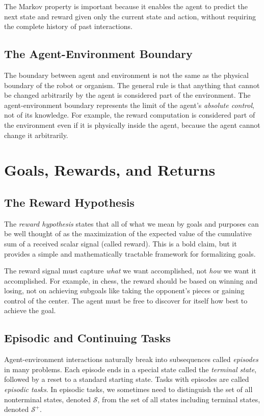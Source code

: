 \documentclass[12pt]{article}
\begin{document}
The Markov property is important because it enables the agent to predict the next state and reward given only the current state and action, without requiring the complete history of past interactions.

\subsection{The Agent-Environment Boundary}

The boundary between agent and environment is not the same as the physical boundary of the robot or organism. The general rule is that anything that cannot be changed arbitrarily by the agent is considered part of the environment. The agent-environment boundary represents the limit of the agent's \textit{absolute control}, not of its knowledge. For example, the reward computation is considered part of the environment even if it is physically inside the agent, because the agent cannot change it arbitrarily.

\section{Goals, Rewards, and Returns}

\subsection{The Reward Hypothesis}

The \textit{reward hypothesis} states that all of what we mean by goals and purposes can be well thought of as the maximization of the expected value of the cumulative sum of a received scalar signal (called reward). This is a bold claim, but it provides a simple and mathematically tractable framework for formalizing goals.

The reward signal must capture \textit{what} we want accomplished, not \textit{how} we want it accomplished. For example, in chess, the reward should be based on winning and losing, not on achieving subgoals like taking the opponent's pieces or gaining control of the center. The agent must be free to discover for itself how best to achieve the goal.

\subsection{Episodic and Continuing Tasks}

Agent-environment interactions naturally break into subsequences called \textit{episodes} in many problems. Each episode ends in a special state called the \textit{terminal state}, followed by a reset to a standard starting state. Tasks with episodes are called \textit{episodic tasks}. In episodic tasks, we sometimes need to distinguish the set of all nonterminal states, denoted $\mathcal{S}$, from the set of all states including terminal states, denoted $\mathcal{S}^+$.
\end{document}
